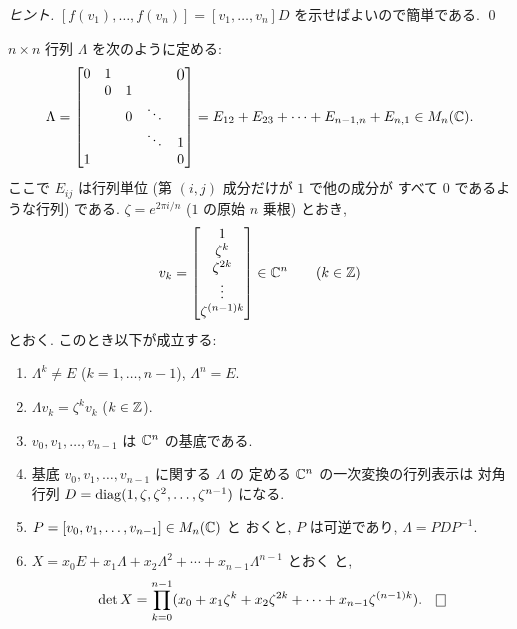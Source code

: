 \documentclass[12pt,twoside]{jarticle}
\begin{document}
\begin{proof}[ヒント]
  $[f(v_1),\ldots,f(v_n)]=[v_1,\ldots,v_n]D$ を示せばよいので簡単である.
  \qed
\end{proof}


\begin{question}[巡回行列とその行列式]
  $n\times n$ 行列 $\Lambda$ を次のように定める:
  \begin{equation*}
    \Lambda = 
    \begin{bmatrix}
      0 & 1 &   & & \bigzerou \\
        & 0 & 1 & & \\
        &   & 0 & \ddots & \\
        &   &   & \ddots & 1 \\
      1 &   &   &        & 0 \\
    \end{bmatrix}
    =
    E_{12} + E_{23} + \cdots + E_{n-1,n} + E_{n,1}
    \in M_n(\C).
  \end{equation*}
  ここで $E_{ij}$ は行列単位 (第 $(i,j)$ 成分だけが $1$ で他の成分が
  すべて $0$ であるような行列) である.
  $\zeta = e^{2\pi i/n}$ ($1$ の原始 $n$ 乗根) とおき,
  \begin{equation*}
    v_k =
    \begin{bmatrix}
      1 \\ \zeta^k \\ \zeta^{2k} \\ \vdots \\ \zeta^{(n-1)k} \\
    \end{bmatrix}
    \in {\mathbb C}^n
    \qquad (k\in{\mathbb Z})
  \end{equation*}
  とおく.  このとき以下が成立する:
  \begin{enumerate}
  \item $\Lambda^k\ne E$ ($k=1,\ldots,n-1$), $\Lambda^n=E$.
  \item $\Lambda v_k = \zeta^k v_k$ ($k\in{\mathbb Z}$).
  \item $v_0,v_1,\ldots,v_{n-1}$ は ${\mathbb C}^n$ の基底である.
  \item 基底 $v_0,v_1,\ldots,v_{n-1}$ に関する $\Lambda$ の
    定める ${\mathbb C}^n$ の一次変換の行列表示は
    対角行列 $D=\mathop{\mathrm{diag}}\nolimits(1,\zeta,\zeta^2,\ldots,\zeta^{n-1})$ になる.
  \item $P=[v_0,v_1,\ldots,v_{n-1}]\in M_n({\mathbb C})$ と
    おくと, $P$ は可逆であり, $\Lambda = PDP^{-1}$.
  \item $X=x_0 E+x_1\Lambda+x_2\Lambda^2+\cdots+x_{n-1}\Lambda^{n-1}$ とおく
    と, 
    \begin{equation*}
      \det X = 
      \prod_{k=0}^{n-1}
      (x_0+x_1\zeta^k+x_2\zeta^{2k}+\cdots+x_{n-1}\zeta^{(n-1)k}).
      \qed
    \end{equation*}
  \end{enumerate}
\end{question}
\end{document}
